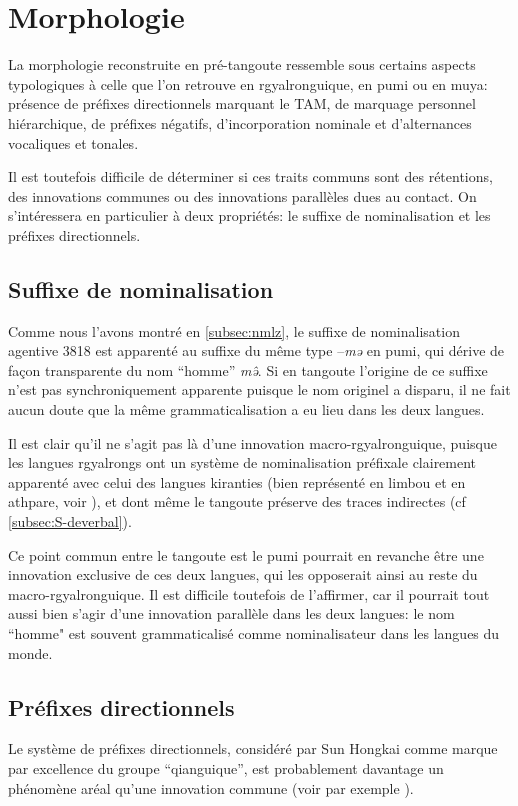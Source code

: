 \documentclass[oldfontcommands,twoside,a4paper,11pt,draft]{memoir}
\newcommand{\tgz}[1]{#1 \mo{#1} \tg{#1}}
\begin{document}
\section{Morphologie}
La morphologie reconstruite en pré-tangoute ressemble sous certains aspects typologiques à celle que l'on retrouve en rgyalronguique, en pumi ou en muya: présence de préfixes directionnels marquant le TAM, de marquage personnel hiérarchique, de préfixes négatifs, d'incorporation nominale et d'alternances vocaliques et tonales. 

Il est toutefois difficile de déterminer si ces traits communs sont des rétentions, des innovations communes ou des innovations parallèles dues au contact. On s'intéressera en particulier à deux propriétés: le suffixe de nominalisation et les préfixes directionnels.

\subsection{Suffixe de nominalisation}
Comme nous l'avons montré en \ref{subsec:nmlz}, le suffixe de nominalisation agentive  \tgz{3818} est   apparenté au suffixe du même type 
 --\textit{mə} en pumi, qui   dérive de façon transparente du nom ``homme''  \textit{mə̂}. Si en tangoute l'origine de ce suffixe n'est pas synchroniquement apparente puisque le nom originel a disparu, il ne fait aucun doute que la même grammaticalisation a eu lieu dans les deux langues.
 
Il est clair qu'il ne s'agit pas là d'une innovation macro-rgyalronguique, puisque les langues rgyalrongs ont un système de nominalisation préfixale clairement apparenté avec celui des langues kiranties (bien représenté en limbou et en athpare, voir \citealt{jacques12agreement}), et dont même le tangoute préserve des traces indirectes (cf \ref{subsec:S-deverbal}).
 
Ce point commun entre le tangoute est le pumi pourrait en revanche être  une innovation exclusive de ces deux langues, qui les opposerait ainsi au reste du macro-rgyalronguique. Il est difficile toutefois de l'affirmer, car il pourrait tout aussi bien s'agir d'une innovation parallèle dans les deux langues: le nom ``homme" est souvent grammaticalisé comme nominalisateur dans les langues du monde.


\subsection{Préfixes directionnels}
Le système de préfixes directionnels, considéré par Sun Hongkai comme marque par excellence du groupe ``qianguique'', est probablement davantage un phénomène aréal qu'une innovation commune (voir par exemple \citealt{chirkova12qiang}). 
\end{document}
